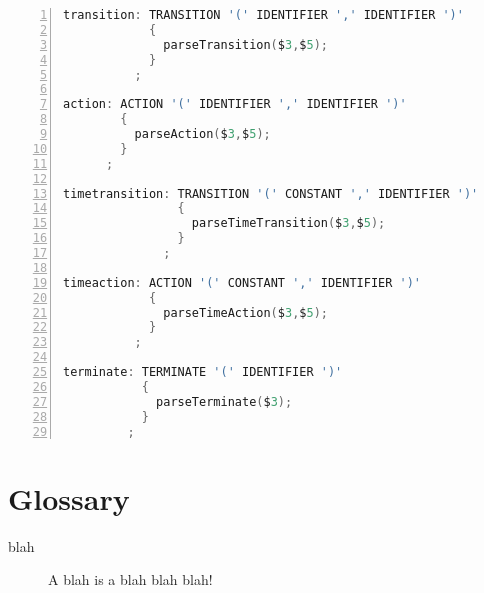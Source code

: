\documentclass[titlepage,letterpaper]{report}
\begin{document}
\begin{lstlisting}[language=C,deleteemph={default},caption={hsmc.y (yacc source)},numbers=left,columns=fixed]
transition: TRANSITION '(' IDENTIFIER ',' IDENTIFIER ')'
            { 
              parseTransition($3,$5);
            }
          ;
        
action: ACTION '(' IDENTIFIER ',' IDENTIFIER ')'
        {
          parseAction($3,$5);
        }
      ;
        
timetransition: TRANSITION '(' CONSTANT ',' IDENTIFIER ')'
                { 
                  parseTimeTransition($3,$5);
                }
              ;
        
timeaction: ACTION '(' CONSTANT ',' IDENTIFIER ')'
            {
              parseTimeAction($3,$5);
            }
          ;
        
terminate: TERMINATE '(' IDENTIFIER ')'
           {
             parseTerminate($3);
           }
         ;
\end{lstlisting}




\newpage
{}
\chapter*{Glossary}
\begin{description}
  \item[blah] A blah is a blah blah blah!
\end{description}

\cleardoublepage
{}



\cleardoublepage
{}
\printindex
\end{document}
